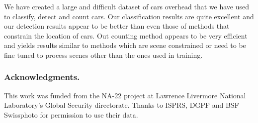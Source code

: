 \documentclass[runningheads]{llncs}
\begin{document}
We have created a large and difficult dataset of cars overhead that we have used to classify, detect and count cars. Our classification results are quite excellent and our detection results appear to be better than even those of methods that constrain the location of cars. Out counting method appears to be very efficient and yields results similar to methods which are scene constrained or need to be fine tuned to process scenes other than the ones used in training.  

\subsubsection{Acknowledgments.}

This work was funded from the NA-22 project at Lawrence Livermore National Laboratory's Global Security directorate. Thanks to ISPRS, DGPF and BSF Swissphoto for permission to use their data. 



\end{document}
